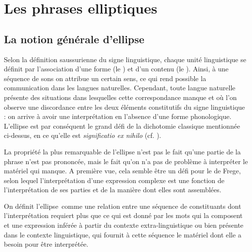 \chapter{Les phrases elliptiques} \label{ch1}
\section{La notion générale d’ellipse} \label{ch1:sect1.1}

Selon la définition saussurienne du signe linguistique, chaque unité linguistique se définit par l’association d’une forme (le ) et d’un contenu (le ). Ainsi, à une séquence de sons on attribue un certain sens, ce qui rend possible la communication dans les langues naturelles. Cependant, toute langue naturelle présente des situations dans lesquelles cette correspondance manque et où l’on observe une discordance entre les deux éléments constitutifs du signe linguistique : on arrive à avoir une interprétation en l’absence d’une forme phonolo\-gique. L’ellipse est par conséquent le grand défi de la dichotomie classique mentionnée ci-dessus, en ce qu’elle est \textit{significatio ex nihilo} (cf. \citealt{Merchant2006}).

La propriété la plus remarquable de l’ellipse n’est pas le fait qu’une partie de la phrase n’est pas prononcée, mais le fait qu’on n’a pas de problème à interpréter le matériel qui manque. A première vue, cela semble être un défi pour le  de Frege, selon lequel l’interprétation d’une expression complexe est une fonction de l’interprétation de ses parties et de la manière dont elles sont assemblées. 

On définit l’ellipse~comme une relation entre une séquence de constituants dont l’interprétation requiert plus que ce qui est donné par les mots qui la composent et une expression inférée à partir du contexte extra-linguistique ou bien présente dans le contexte linguistique, qui fournit à cette séquence le matériel dont elle a besoin pour être interprétée. 

